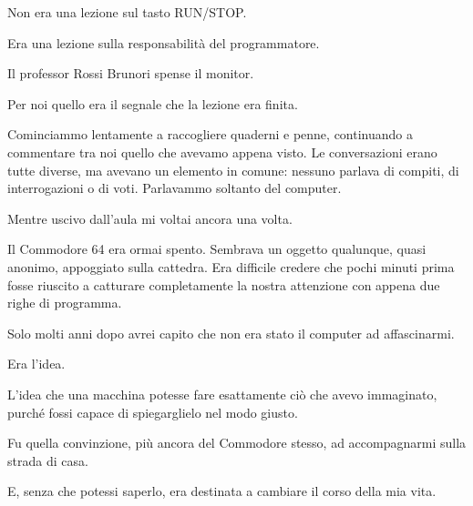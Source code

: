 \documentclass{article}
\begin{document}
Non era una lezione sul tasto RUN/STOP.

Era una lezione sulla responsabilità del programmatore.

Il professor Rossi Brunori spense il monitor.

Per noi quello era il segnale che la lezione era finita.

Cominciammo lentamente a raccogliere quaderni e penne, continuando a commentare tra noi quello che avevamo appena visto.
Le conversazioni erano tutte diverse, ma avevano un elemento in comune: nessuno parlava di compiti, di interrogazioni o
di voti. Parlavammo soltanto del computer.

Mentre uscivo dall'aula mi voltai ancora una volta.

Il Commodore 64 era ormai spento. Sembrava un oggetto qualunque, quasi anonimo, appoggiato sulla cattedra. Era difficile
credere che pochi minuti prima fosse riuscito a catturare completamente la nostra attenzione con appena due righe di
programma.

Solo molti anni dopo avrei capito che non era stato il computer ad affascinarmi.

Era l'idea.

L'idea che una macchina potesse fare esattamente ciò che avevo immaginato, purché fossi capace di spiegarglielo nel modo
giusto.

Fu quella convinzione, più ancora del Commodore stesso, ad accompagnarmi sulla strada di casa.

E, senza che potessi saperlo, era destinata a cambiare il corso della mia vita.


\bigskip
\end{document}
